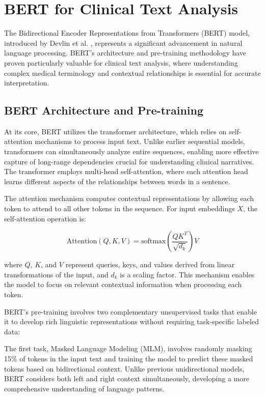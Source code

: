 \documentclass[3p,times,procedia]{elsarticle}
\begin{document}
\section{BERT for Clinical Text Analysis}\label{bert_fundamentals}

The Bidirectional Encoder Representations from Transformers (BERT) model, introduced by Devlin et al. \cite{Devlin2018}, represents a significant advancement in natural language processing. BERT's architecture and pre-training methodology have proven particularly valuable for clinical text analysis, where understanding complex medical terminology and contextual relationships is essential for accurate interpretation.

\subsection{BERT Architecture and Pre-training}

At its core, BERT utilizes the transformer architecture, which relies on self-attention mechanisms to process input text. Unlike earlier sequential models, transformers can simultaneously analyze entire sequences, enabling more effective capture of long-range dependencies crucial for understanding clinical narratives. The transformer employs multi-head self-attention, where each attention head learns different aspects of the relationships between words in a sentence.

The attention mechanism computes contextual representations by allowing each token to attend to all other tokens in the sequence. For input embeddings $X$, the self-attention operation is:

\begin{equation}
\text{Attention}(Q, K, V) = \text{softmax}\left(\frac{QK^T}{\sqrt{d_k}}\right)V
\end{equation}

where $Q$, $K$, and $V$ represent queries, keys, and values derived from linear transformations of the input, and $d_k$ is a scaling factor. This mechanism enables the model to focus on relevant contextual information when processing each token.

BERT's pre-training involves two complementary unsupervised tasks that enable it to develop rich linguistic representations without requiring task-specific labeled data:

The first task, Masked Language Modeling (MLM), involves randomly masking 15\% of tokens in the input text and training the model to predict these masked tokens based on bidirectional context. Unlike previous unidirectional models, BERT considers both left and right context simultaneously, developing a more comprehensive understanding of language patterns. 
\end{document}
